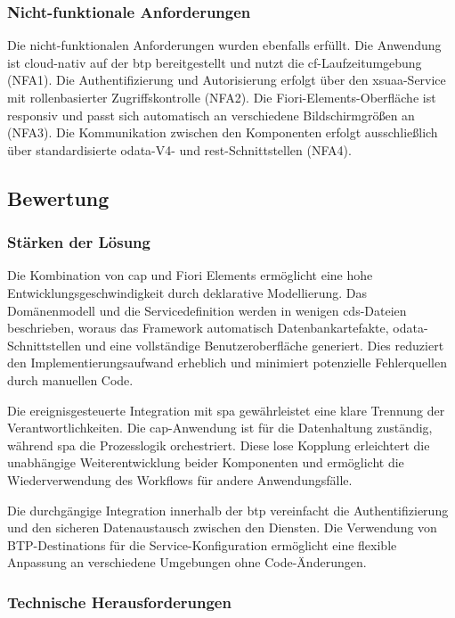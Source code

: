 \subsubsection{Nicht-funktionale Anforderungen}

Die nicht-funktionalen Anforderungen wurden ebenfalls erfüllt. Die Anwendung ist cloud-nativ auf der \gls{btp} bereitgestellt und nutzt die \gls{cf}-Laufzeitumgebung (NFA1). Die Authentifizierung und Autorisierung erfolgt über den \gls{xsuaa}-Service mit rollenbasierter Zugriffskontrolle (NFA2). Die Fiori-Elements-Oberfläche ist responsiv und passt sich automatisch an verschiedene Bildschirmgrößen an (NFA3). Die Kommunikation zwischen den Komponenten erfolgt ausschließlich über standardisierte \gls{odata}-V4- und \gls{rest}-Schnittstellen (NFA4).

\subsection{Bewertung}

\subsubsection{Stärken der Lösung}

Die Kombination von \gls{cap} und Fiori Elements ermöglicht eine hohe Entwicklungsgeschwindigkeit durch deklarative Modellierung. Das Domänenmodell und die Servicedefinition werden in wenigen \gls{cds}-Dateien beschrieben, woraus das Framework automatisch Datenbankartefakte, \gls{odata}-Schnittstellen und eine vollständige Benutzeroberfläche generiert. Dies reduziert den Implementierungsaufwand erheblich und minimiert potenzielle Fehlerquellen durch manuellen Code.

Die ereignisgesteuerte Integration mit \gls{spa} gewährleistet eine klare Trennung der Verantwortlichkeiten. Die \gls{cap}-Anwendung ist für die Datenhaltung zuständig, während \gls{spa} die Prozesslogik orchestriert. Diese lose Kopplung erleichtert die unabhängige Weiterentwicklung beider Komponenten und ermöglicht die Wiederverwendung des Workflows für andere Anwendungsfälle.

Die durchgängige Integration innerhalb der \gls{btp} vereinfacht die Authentifizierung und den sicheren Datenaustausch zwischen den Diensten. Die Verwendung von BTP-Destinations für die Service-Konfiguration ermöglicht eine flexible Anpassung an verschiedene Umgebungen ohne Code-Änderungen.

\subsubsection{Technische Herausforderungen}

